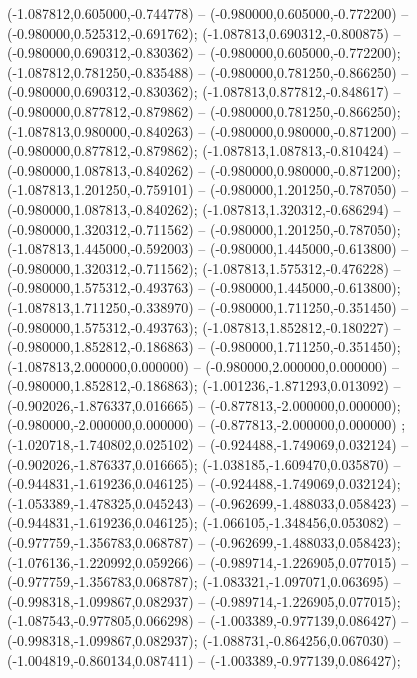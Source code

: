  (-1.087812,0.605000,-0.744778) -- (-0.980000,0.605000,-0.772200) -- (-0.980000,0.525312,-0.691762);
 (-1.087813,0.690312,-0.800875) -- (-0.980000,0.690312,-0.830362) -- (-0.980000,0.605000,-0.772200);
 (-1.087812,0.781250,-0.835488) -- (-0.980000,0.781250,-0.866250) -- (-0.980000,0.690312,-0.830362);
 (-1.087813,0.877812,-0.848617) -- (-0.980000,0.877812,-0.879862) -- (-0.980000,0.781250,-0.866250);
 (-1.087813,0.980000,-0.840263) -- (-0.980000,0.980000,-0.871200) -- (-0.980000,0.877812,-0.879862);
 (-1.087813,1.087813,-0.810424) -- (-0.980000,1.087813,-0.840262) -- (-0.980000,0.980000,-0.871200);
 (-1.087813,1.201250,-0.759101) -- (-0.980000,1.201250,-0.787050) -- (-0.980000,1.087813,-0.840262);
 (-1.087813,1.320312,-0.686294) -- (-0.980000,1.320312,-0.711562) -- (-0.980000,1.201250,-0.787050);
 (-1.087813,1.445000,-0.592003) -- (-0.980000,1.445000,-0.613800) -- (-0.980000,1.320312,-0.711562);
 (-1.087813,1.575312,-0.476228) -- (-0.980000,1.575312,-0.493763) -- (-0.980000,1.445000,-0.613800);
 (-1.087813,1.711250,-0.338970) -- (-0.980000,1.711250,-0.351450) -- (-0.980000,1.575312,-0.493763);
 (-1.087813,1.852812,-0.180227) -- (-0.980000,1.852812,-0.186863) -- (-0.980000,1.711250,-0.351450);
 (-1.087813,2.000000,0.000000) -- (-0.980000,2.000000,0.000000) -- (-0.980000,1.852812,-0.186863);
 (-1.001236,-1.871293,0.013092) -- (-0.902026,-1.876337,0.016665) -- (-0.877813,-2.000000,0.000000);
 (-0.980000,-2.000000,0.000000) -- (-0.877813,-2.000000,0.000000) ;
 (-1.020718,-1.740802,0.025102) -- (-0.924488,-1.749069,0.032124) -- (-0.902026,-1.876337,0.016665);
 (-1.038185,-1.609470,0.035870) -- (-0.944831,-1.619236,0.046125) -- (-0.924488,-1.749069,0.032124);
 (-1.053389,-1.478325,0.045243) -- (-0.962699,-1.488033,0.058423) -- (-0.944831,-1.619236,0.046125);
 (-1.066105,-1.348456,0.053082) -- (-0.977759,-1.356783,0.068787) -- (-0.962699,-1.488033,0.058423);
 (-1.076136,-1.220992,0.059266) -- (-0.989714,-1.226905,0.077015) -- (-0.977759,-1.356783,0.068787);
 (-1.083321,-1.097071,0.063695) -- (-0.998318,-1.099867,0.082937) -- (-0.989714,-1.226905,0.077015);
 (-1.087543,-0.977805,0.066298) -- (-1.003389,-0.977139,0.086427) -- (-0.998318,-1.099867,0.082937);
 (-1.088731,-0.864256,0.067030) -- (-1.004819,-0.860134,0.087411) -- (-1.003389,-0.977139,0.086427);
